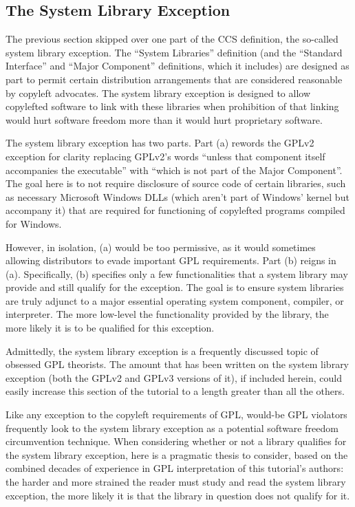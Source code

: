 \subsection{The System Library Exception}
\label{GPLv3-system-library-exception}

The previous section skipped over one part of the CCS definition, the
so-called system library exception.  The ``System Libraries'' definition (and
the ``Standard Interface'' and ``Major Component'' definitions, which it
includes) are designed as part
to permit certain distribution arrangements that are considered reasonable by
copyleft advocates.  The system library exception is designed to allow
copylefted software to link with these libraries when prohibition of that linking would hurt
software freedom more than it would hurt proprietary software.

The system library exception has two parts.  Part (a) rewords the GPLv2
exception for clarity replacing GPLv2's words ``unless that component itself
accompanies the executable'' with ``which is not part of the Major
Component''.  The goal here is to not require disclosure of source code of
certain libraries, such as necessary Microsoft Windows DLLs (which aren't
part of Windows' kernel but accompany it) that are required for functioning
of copylefted programs compiled for Windows.

However, in isolation, (a) would be too permissive, as it would sometimes
allowing distributors to evade important GPL requirements.  Part (b) reigns
in (a).  Specifically, (b) specifies only a few functionalities that a
system library may provide and still qualify for the exception.  The goal is
to ensure system libraries are truly adjunct to a major essential operating
system component, compiler, or interpreter.  The more low-level the
functionality provided by the library, the more likely it is to be qualified
for this exception.

Admittedly, the system library exception is a frequently discussed topic of
obsessed GPL theorists.  The amount that has been written on the system
library exception (both the GPLv2 and GPLv3 versions of it), if included
herein,  could easily increase this section of the tutorial to a length
greater than all the others.

Like any exception to the copyleft requirements of GPL, would-be GPL
violators frequently look to the system library exception as a potential
software freedom circumvention technique.  When considering whether or not a
library qualifies for the system library exception, here is a pragmatic
thesis to consider, based on the combined decades of experience in GPL
interpretation of this tutorial's authors: the harder and more strained the
reader must study and read the system library exception, the more likely it
is that the library in question does not qualify for it.

